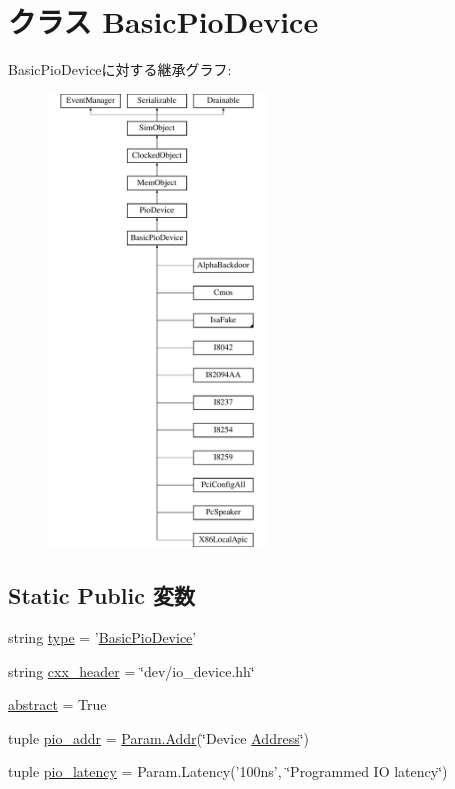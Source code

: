 \hypertarget{classDevice_1_1BasicPioDevice}{
\section{クラス BasicPioDevice}
\label{classDevice_1_1BasicPioDevice}
}
BasicPioDeviceに対する継承グラフ:\begin{figure}[H]
\begin{center}
\leavevmode
\includegraphics[height=12cm]{classDevice_1_1BasicPioDevice}
\end{center}
\end{figure}
\subsection*{Static Public 変数}
\begin{DoxyCompactItemize}
\item 
string \hyperlink{classDevice_1_1BasicPioDevice_acce15679d830831b0bbe8ebc2a60b2ca}{type} = '\hyperlink{classDevice_1_1BasicPioDevice}{BasicPioDevice}'
\item 
string \hyperlink{classDevice_1_1BasicPioDevice_a17da7064bc5c518791f0c891eff05fda}{cxx\_\-header} = \char`\"{}dev/io\_\-device.hh\char`\"{}
\item 
\hyperlink{classDevice_1_1BasicPioDevice_a17fa61ac3806b481cafee5593b55e5d0}{abstract} = True
\item 
tuple \hyperlink{classDevice_1_1BasicPioDevice_aac8239d62c5a04a05fcc71d4ac63fdb4}{pio\_\-addr} = \hyperlink{base_2types_8hh_af1bb03d6a4ee096394a6749f0a169232}{Param.Addr}(\char`\"{}Device \hyperlink{classAddress}{Address}\char`\"{})
\item 
tuple \hyperlink{classDevice_1_1BasicPioDevice_ac3f272675842a6662ce8782e10fdba39}{pio\_\-latency} = Param.Latency('100ns', \char`\"{}Programmed IO latency\char`\"{})
\end{DoxyCompactItemize}


